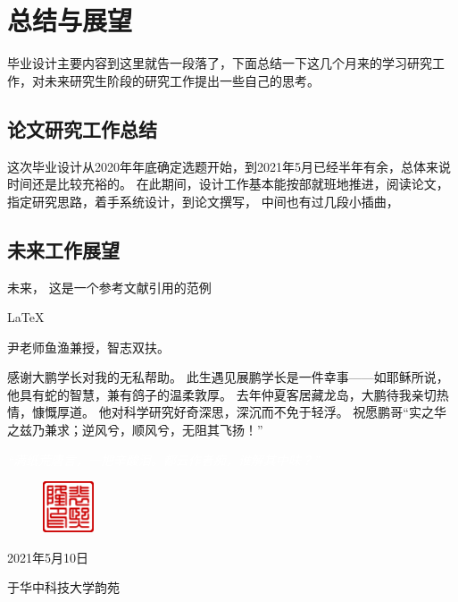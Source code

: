 \documentclass[supercite]{HustGraduPaper}
\begin{document}
\section{总结与展望}\label{sec:conclusion}

毕业设计主要内容到这里就告一段落了，下面总结一下这几个月来的学习研究工作，对未来研究生阶段的研究工作提出一些自己的思考。

\subsection{论文研究工作总结}

这次毕业设计从2020年年底确定选题开始，到2021年5月已经半年有余，总体来说时间还是比较充裕的。
在此期间，设计工作基本能按部就班地推进，阅读论文，指定研究思路，着手系统设计，到论文撰写，
中间也有过几段小插曲，

\subsection{未来工作展望}

未来，
这是一个参考文献引用的范例\cite{5502350, liang2019large}

\begin{thankpage}
	


	\LaTeX
	
	尹老师鱼渔兼授，智志双扶。

	感谢大鹏学长对我的无私帮助。
	此生遇见展鹏学长是一件幸事——如耶稣所说，他具有蛇的智慧，兼有鸽子的温柔敦厚。
	去年仲夏客居藏龙岛，大鹏待我亲切热情，慷慨厚道。
	他对科学研究好奇深思，深沉而不免于轻浮。
	祝愿鹏哥“实之华之兹乃兼求；逆风兮，顺风兮，无阻其飞扬！”



	\begin{center}
		\textcolor{white}{\itshape “满纸荒唐言，一把辛酸泪。都云作者痴，谁解其中味？”}
	\end{center}
	
	\begin{figure}[htb]
		\raggedleft
		\includegraphics[width=15mm]{Figures/Seal-pxl.pdf}
	\end{figure}

	\begin{flushright}
		2021年5月10日

		于华中科技大学韵苑
	\end{flushright}
	
\end{thankpage}
\end{document}

